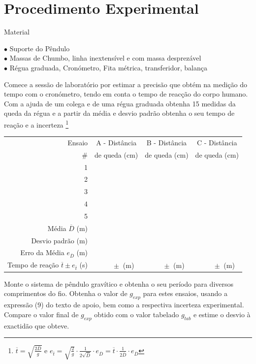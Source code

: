 \documentclass[a4paper,12pt]{article}      %
\begin{document}
\section{\sf Procedimento Experimental}
{ \large Material }
 \begin{flushleft}
	 $\bullet$ Suporte do Pêndulo \\
	 $\bullet$ Massas de Chumbo, linha inextensível e com massa desprezável \\
	 $\bullet$ Régua graduada, Cronómetro, Fita métrica, transferidor, balança
\end{flushleft} 

Comece a sessão de laboratório por estimar a precisão que obtém na medição do tempo com o cronómetro, tendo em conta 
o tempo de reacção do corpo humano. 
Com a ajuda de um colega e de uma régua graduada obtenha 15 medidas da queda da régua e a partir da média e desvio padrão obtenha o seu tempo de reação e a incerteza \footnote{$\overline{t}=\sqrt{\frac{2 \overline{D}}{g}}$ e   
$e_{\overline{t}}=\sqrt{\frac{2 }{g}} \cdot \frac{1}{2\sqrt{\overline{D}}} \cdot e_{\overline{D}}  
= \overline{t} \cdot \frac{1}{2\overline{D}} \cdot e_{\overline{D}} $ }

\begin{tabular}{|r|c|c|c|}
\hline
Ensaio  & A - Distância & B - Distância & C - Distância  \\
\# & de queda (cm) & de queda (cm) & de queda (cm)\\
\hline \hline
1 & & & \\
\hline
2 & &  &\\
\hline 3 & & & \\
\hline 4 & & & \\
\hline 5 & & & \\
\hline \hline
Média $\overline{D}$ (m) & &  & \\
Desvio padrão (m) & & & \\
Erro da Média  $e_{\overline{D}}$ (m) & & & \\ 
Tempo de reação $\overline{t} \pm e_{\overline{t}}$ (s) & $\qquad \pm$ \quad(m) & $\qquad \pm$ \quad (m) & $\qquad \pm$ \quad (m) \\
\hline
\end{tabular}

Monte o sistema de pêndulo gravítico e obtenha o seu período para diversos comprimentos do fio. 
Obtenha o valor de $g_{exp}$ para estes ensaios, usando a expressão (9) do texto de apoio, bem como a respectiva incerteza experimental. 
Compare o valor final de $g_{exp}$ obtido com o valor tabelado $g_{tab}$ e estime o desvio à exactidão que obteve. 
\end{document}
